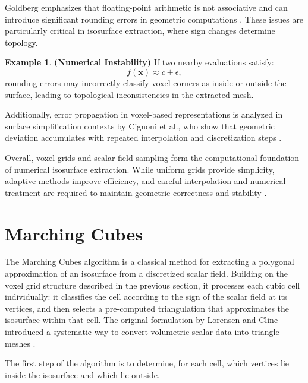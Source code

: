 \documentclass[12pt, a4paper, oneside]{book}
\theoremstyle{plain}
\theoremstyle{definition}
\newtheorem{example}[theorem]{Example}
\theoremstyle{remark}
\theoremstyle{definition}
\begin{document}
Goldberg emphasizes that floating-point arithmetic is not associative and can introduce
significant rounding errors in geometric computations \cite{goldberg1991every}. These
issues are particularly critical in isosurface extraction, where sign changes determine
topology.

\begin{example}
    \textbf{(Numerical Instability)}
If two nearby evaluations satisfy:
\[
f(\mathbf{x}) \approx c \pm \epsilon,
\]
rounding errors may incorrectly classify voxel corners as inside or outside the surface,
leading to topological inconsistencies in the extracted mesh.
\end{example}

Additionally, error propagation in voxel-based representations is analyzed in surface
simplification contexts by Cignoni et al., who show that geometric deviation accumulates
with repeated interpolation and discretization steps \cite{cignoni1998metro}.

\vspace{0.5em}

Overall, voxel grids and scalar field sampling form the computational foundation of
numerical isosurface extraction. While uniform grids provide simplicity, adaptive methods
improve efficiency, and careful interpolation and numerical treatment are required to
maintain geometric correctness and stability
\cite{lorensen1998marching,bloomenthal1997introduction,frisken2000adaptively,cignoni1998metro,goldberg1991every}.

\section{Marching Cubes}

The Marching Cubes algorithm is a classical method for extracting a polygonal
approximation of an isosurface from a discretized scalar field. Building on the voxel
grid structure described in the previous section, it processes each cubic cell
individually: it classifies the cell according to the sign of the scalar field at its
vertices, and then selects a pre-computed triangulation that approximates the isosurface
within that cell. The original formulation by Lorensen and Cline introduced a systematic
way to convert volumetric scalar data into triangle meshes \cite{lorensen1998marching}.

\vspace{0.5em}

The first step of the algorithm is to determine, for each cell, which vertices lie inside
the isosurface and which lie outside.
\end{document}

